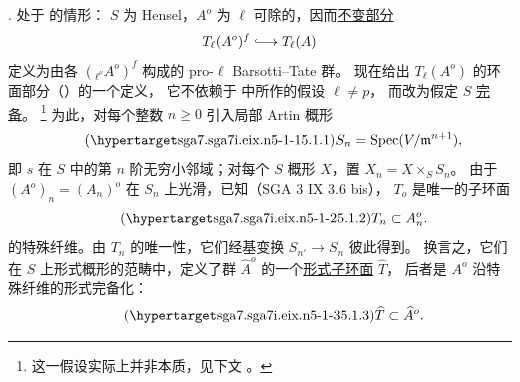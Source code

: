 \medskip
\noindent
{}. 处于  的情形：
$S$ 为 Hensel，$A^o$ 为 $\ell$ 可除的，因而\underline{不变部分}
\[
 T_\ell(A^o)^f\lhook\joinrel\longrightarrow T_\ell(A)
\]
定义为由各 $({}_{\ell^\nu}A^o)^f$ 构成的 pro-$\ell$ Barsotti--Tate 群。
现在给出 $T_\ell(A^o)$ 的环面部分（）的一个定义，
它不依赖于  中所作的假设 $\ell\neq p$，
而改为假定 $S$ \underline{完备}。
\footnote{这一假设实际上并非本质，见下文 。}
为此，对每个整数 $n\geq0$ 引入局部 Artin 概形
\begin{equation}\tag{\SGARefTarget{sga7.sga7i.eix.n5-1-1}{5.1.1}}
 S_n=\operatorname{Spec}(V/\mathfrak m^{n+1}),
\end{equation}
即 $s$ 在 $S$ 中的第 $n$ 阶无穷小邻域；对每个 $S$ 概形 $X$，置 $X_n=X\times_S S_n$。
由于 $(A^o)_n=(A_n)^o$ 在 $S_n$ 上光滑，已知（SGA 3 IX 3.6 bis），
$T_o$ 是唯一的子环面
\begin{equation}\tag{\SGARefTarget{sga7.sga7i.eix.n5-1-2}{5.1.2}}
 T_n\subset A_n^o.
\end{equation}
的特殊纤维。由 $T_n$ 的唯一性，它们经基变换 $S_{n'}\longrightarrow S_n$ 彼此得到。
换言之，它们在 $S$ 上形式概形的范畴中，定义了群 $\widehat A^o$ 的一个\underline{形式子环面} $\widehat T$，
后者是 $A^o$ 沿特殊纤维的形式完备化：
\begin{equation}\tag{\SGARefTarget{sga7.sga7i.eix.n5-1-3}{5.1.3}}
 \widehat T\subset\widehat A^o.
\end{equation}

